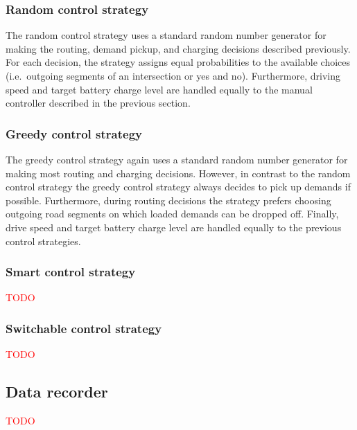 \documentclass[10pt,twocolumn]{article}
\begin{document}
\subsubsection*{Random control strategy}
\label{sec:controller-random}

The random control strategy uses a standard random number generator for making the routing, demand pickup, and charging decisions described previously.
For each decision, the strategy assigns equal probabilities to the available choices (i.e.\ outgoing segments of an intersection or yes and no).
Furthermore, driving speed and target battery charge level are handled equally to the manual controller described in the previous section.

\subsubsection*{Greedy control strategy}
\label{sec:controller-greedy}

The greedy control strategy again uses a standard random number generator for making most routing and charging decisions.
However, in contrast to the random control strategy the greedy control strategy always decides to pick up demands if possible.
Furthermore, during routing decisions the strategy prefers choosing outgoing road segments on which loaded demands can be dropped off.
Finally, drive speed and target battery charge level are handled equally to the previous control strategies.

\subsubsection*{Smart control strategy}
\label{sec:controller-smart}

\textcolor{red}{TODO}

\subsubsection*{Switchable control strategy}
\label{sec:controller-switch}

\textcolor{red}{TODO}

\subsection{Data recorder}
\label{sec:statistics-interface}

\textcolor{red}{TODO}
\end{document}
